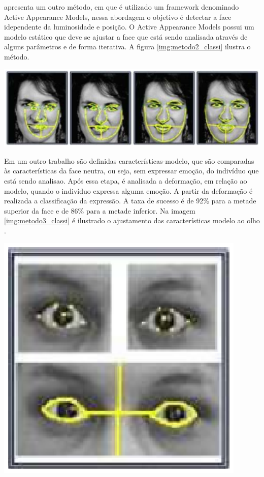 \cite{Edwards} apresenta um outro método, em que é utilizado um framework denominado Active Appearance Models, nessa abordagem o objetivo é detectar a face idependente da luminosidade e posição. O  Active Appearance Models
possui um modelo estático que deve se ajustar a face que está sendo analisada através de alguns parâmetros e de forma iterativa. A figura \ref{img:metodo2_classi} ilustra o método.
\begin{center}
	\includegraphics[scale=0.5]{graficos/metodo2_classi}
	\label{img:metodo2_classi}
\end{center}

Em um outro trabalho são definidas características-modelo, que são comparadas às características da face neutra, ou seja, sem expressar emoção, do indivíduo que está sendo analisao. Após essa etapa, é analisada a deformação, em relação ao modelo, quando o indivíduo expressa alguma emoção. A partir da deformação é realizada a classificação da expressão. A taxa de sucesso é de 92\% para a metade superior da face e de
86\% para a metade inferior. Na imagem \ref{img:metodo3_classi} é ilustrado o ajustamento das características modelo ao olho \cite{Pantic}.
\begin{center}
	\includegraphics[scale=0.5]{graficos/metodo3_classi}
	\label{img:metodo3_classi}
\end{center}

